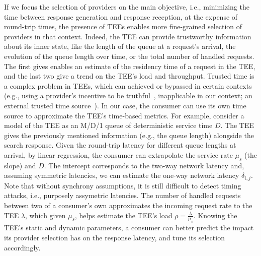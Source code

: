 If we focus the selection of providers on the main objective, i.e., minimizing the time between response generation and response reception, at the expense of round-trip times, the presence of TEEs enables more fine-grained selection of providers in that context.
Indeed, the TEE can provide trustworthy information about its inner state, like the length of the queue at a request's arrival, the evolution of the queue length over time, or the total number of handled requests.
The first gives enables an estimate of the residency time of a request in the TEE, and the last two give a trend on the TEE's load and throughput.
Trusted time is a complex problem in TEEs, which can achieved or bypassed in certain contexts (e.g., using a provider's incentive to be truthful~\cite{alder2019s}, inapplicable in our context; an external trusted time source~\cite{hamidy2023t3e}). 
In our case, the consumer can use its own time source to approximate the TEE's time-based metrics. For example, consider a model of the TEE as an M/D/1 queue of deterministic service time $D$. The TEE gives the previously mentioned information (e.g., the queue length) alongside the search response. Given the round-trip latency for different queue lengths at arrival, by linear regression, the consumer can extrapolate the service rate $\mu_{s}$ (the slope) and $D$. The intercept corresponds to the two-way network latency and, assuming symmetric latencies, we can estimate the one-way network latency $\delta_{i,j}$. Note that without synchrony assumptions, it is still difficult to detect timing attacks, i.e., purposely assymetric latencies. The number of handled requests between two of a consumer's own approximates the incoming request rate to the TEE $\lambda$, which given $\mu_{s}$, helps estimate the TEE's load $\rho=\frac{\lambda}{\mu_{s}}$. Knowing the TEE's static and dynamic parameters, a consumer can better predict the impact its provider selection has on the response latency, and tune its selection accordingly.